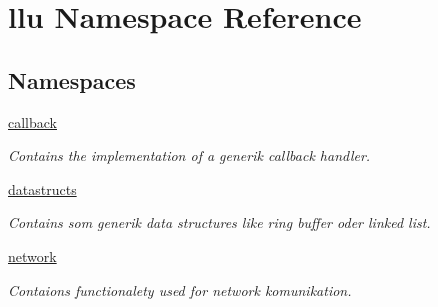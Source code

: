 \hypertarget{namespacellu}{\section{llu Namespace Reference}
\label{namespacellu}
}
\subsection*{Namespaces}
\begin{DoxyCompactItemize}
\item 
 \hyperlink{namespacellu_1_1callback}{callback}
\begin{DoxyCompactList}\small\item\em Contains the implementation of a generik callback handler. \end{DoxyCompactList}\item 
 \hyperlink{namespacellu_1_1datastructs}{datastructs}
\begin{DoxyCompactList}\small\item\em Contains som generik data structures like ring buffer oder linked list. \end{DoxyCompactList}\item 
 \hyperlink{namespacellu_1_1network}{network}
\begin{DoxyCompactList}\small\item\em Contaions functionalety used for network komunikation. \end{DoxyCompactList}\end{DoxyCompactItemize}
